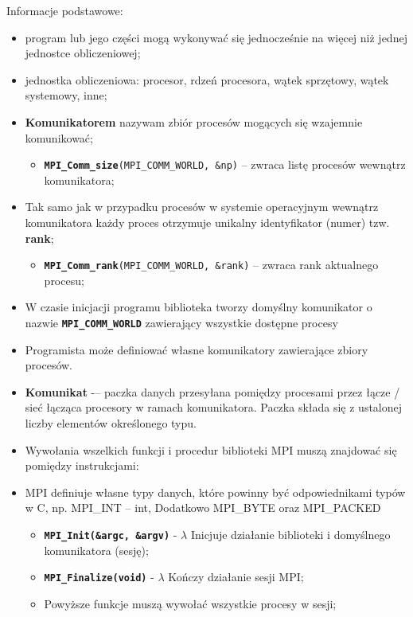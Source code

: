 Informacje podstawowe: 
\begin{itemize}
\item program lub jego części mogą wykonywać się jednocześnie na więcej niż jednej jednostce obliczeniowej;
\item jednostka obliczeniowa: procesor, rdzeń procesora, wątek sprzętowy, wątek systemowy, inne;
\item \textbf{Komunikatorem} nazywam zbiór procesów mogących się wzajemnie komunikować;
\begin{itemize}
\item \texttt{\textbf{MPI\_Comm\_size}(MPI\_COMM\_WORLD, \&np)} – zwraca listę procesów wewnątrz komunikatora;
\end{itemize}
\item Tak samo jak w przypadku procesów w systemie operacyjnym wewnątrz komunikatora każdy proces otrzymuje unikalny identyfikator (numer) tzw. \textbf{rank};
\begin{itemize}
\item \texttt{\textbf{MPI\_Comm\_rank}(MPI\_COMM\_WORLD, \&rank)} – zwraca rank aktualnego procesu;
\end{itemize}
\item W czasie inicjacji programu biblioteka tworzy domyślny komunikator o nazwie \texttt{\textbf{MPI\_COMM\_WORLD}} zawierający wszystkie dostępne procesy
\item Programista może definiować własne komunikatory zawierające zbiory procesów.
\item \textbf{Komunikat} -– paczka danych przesyłana pomiędzy procesami przez łącze / sieć łącząca procesory w ramach komunikatora. Paczka składa się z ustalonej liczby elementów określonego typu.
\item Wywołania wszelkich funkcji i procedur biblioteki MPI muszą znajdować się pomiędzy instrukcjami:
\item MPI definiuje własne typy danych, które powinny być odpowiednikami typów w C, np. MPI\_INT – int, Dodatkowo MPI\_BYTE oraz MPI\_PACKED
\begin{itemize}
\item \texttt{\textbf{MPI\_Init(\&argc, \&argv)}} - $\lambda$ Inicjuje działanie biblioteki i domyślnego komunikatora (sesję);
\item \texttt{\textbf{MPI\_Finalize(void)}} - $\lambda$ Kończy działanie sesji MPI;
\item Powyższe funkcje muszą wywołać wszystkie procesy w sesji;
\end{itemize}
\end{itemize}

